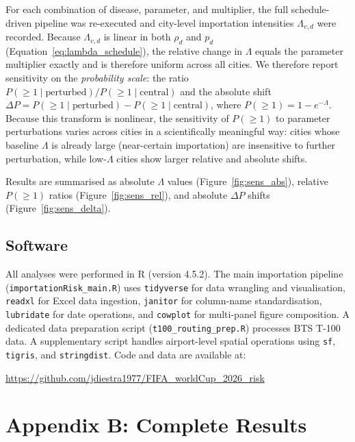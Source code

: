 \documentclass[12pt]{article}
\begin{document}
For each combination of disease, parameter, and multiplier, the
full schedule-driven pipeline was re-executed and city-level
importation intensities $\Lambda_{v,d}$ were recorded. Because
$\Lambda_{v,d}$ is linear in both $\rho_d$ and $p_d$
(Equation~\ref{eq:lambda_schedule}), the relative change in $\Lambda$
equals the parameter multiplier exactly and is therefore uniform
across all cities. We therefore report sensitivity on the
\emph{probability scale}: the ratio
$P(\geq 1 \mid \text{perturbed}) / P(\geq 1 \mid \text{central})$
and the absolute shift
$\Delta P = P(\geq 1 \mid \text{perturbed}) - P(\geq 1 \mid \text{central})$,
where $P(\geq 1) = 1 - e^{-\Lambda}$. Because this transform is
nonlinear, the sensitivity of $P(\geq 1)$ to parameter perturbations
varies across cities in a scientifically meaningful way: cities whose
baseline $\Lambda$ is already large (near-certain importation) are
insensitive to further perturbation, while low-$\Lambda$ cities show
larger relative and absolute shifts.

Results are summarised as absolute $\Lambda$ values
(Figure~\ref{fig:sens_abs}), relative $P(\geq 1)$ ratios
(Figure~\ref{fig:sens_rel}), and absolute $\Delta P$ shifts
(Figure~\ref{fig:sens_delta}).

\subsection*{Software}

All analyses were performed in R (version 4.5.2). The main
importation pipeline (\texttt{importationRisk\_main.R}) uses
\texttt{tidyverse} for data wrangling and visualisation,
\texttt{readxl} for Excel data ingestion, \texttt{janitor} for
column-name standardisation, \texttt{lubridate} for date operations,
and \texttt{cowplot} for multi-panel figure composition. A dedicated
data preparation script (\texttt{t100\_routing\_prep.R}) processes
BTS T-100 data. A supplementary script handles airport-level spatial
operations using \texttt{sf}, \texttt{tigris}, and \texttt{stringdist}.
Code and data are available at:
{\sloppy\begin{center}
\small\url{https://github.com/jdiestra1977/FIFA_worldCup_2026_risk}
\end{center}}

\section*{Appendix B: Complete Results}
\end{document}
